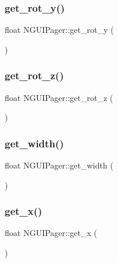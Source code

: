 \hypertarget{class_n_g_u_i_pager_acd8b3a81ac2c8cd8324d6c132734edc1}{}\label{class_n_g_u_i_pager_acd8b3a81ac2c8cd8324d6c132734edc1} 
\subsubsection{\texorpdfstring{get\+\_\+rot\+\_\+y()}{get\_rot\_y()}}
{\footnotesize\ttfamily float N\+G\+U\+I\+Pager\+::get\+\_\+rot\+\_\+y (\begin{DoxyParamCaption}{ }\end{DoxyParamCaption})}

\hypertarget{class_n_g_u_i_pager_ad72cc4b0e6885a91350452e13f65ae19}{}\label{class_n_g_u_i_pager_ad72cc4b0e6885a91350452e13f65ae19} 
\subsubsection{\texorpdfstring{get\+\_\+rot\+\_\+z()}{get\_rot\_z()}}
{\footnotesize\ttfamily float N\+G\+U\+I\+Pager\+::get\+\_\+rot\+\_\+z (\begin{DoxyParamCaption}{ }\end{DoxyParamCaption})}

\hypertarget{class_n_g_u_i_pager_a759486a9acfb4c874b029a6a643ef9dd}{}\label{class_n_g_u_i_pager_a759486a9acfb4c874b029a6a643ef9dd} 
\subsubsection{\texorpdfstring{get\+\_\+width()}{get\_width()}}
{\footnotesize\ttfamily float N\+G\+U\+I\+Pager\+::get\+\_\+width (\begin{DoxyParamCaption}{ }\end{DoxyParamCaption})}

\hypertarget{class_n_g_u_i_pager_aac1ba461eebaa98f3a795b5fb7ff4d6b}{}\label{class_n_g_u_i_pager_aac1ba461eebaa98f3a795b5fb7ff4d6b} 
\subsubsection{\texorpdfstring{get\+\_\+x()}{get\_x()}}
{\footnotesize\ttfamily float N\+G\+U\+I\+Pager\+::get\+\_\+x (\begin{DoxyParamCaption}{ }\end{DoxyParamCaption})}

